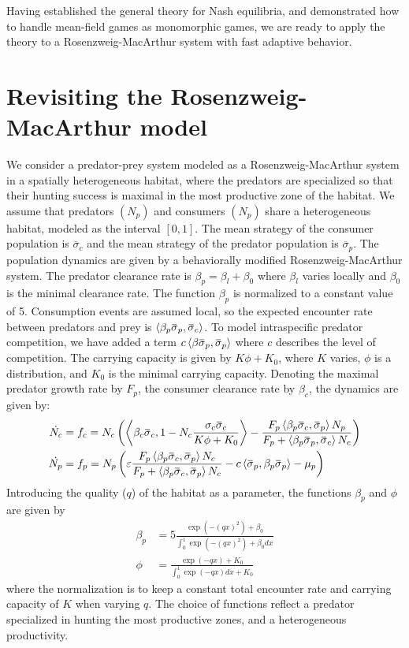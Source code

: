 Having established the general theory for Nash equilibria, and demonstrated how to handle mean-field games as monomorphic games, we are ready to apply the theory to a Rosenzweig-MacArthur system with fast adaptive behavior.
\section{Revisiting the Rosenzweig-MacArthur model}
\label{sec:model_rm}
We consider a predator-prey system modeled as a Rosenzweig-MacArthur system in a spatially heterogeneous habitat, where the predators are specialized so that their hunting success is maximal in the most productive zone of the habitat.
We assume that predators $(N_p)$ and consumers $(N_p)$ share a heterogeneous habitat, modeled as the interval $[0,1]$. The mean strategy of the consumer population is $\overbar{\sigma}_c$ and the mean strategy of the predator population is $\overbar{\sigma}_p$.
The population dynamics are given by a behaviorally modified Rosenzweig-MacArthur system. The predator clearance rate is $\beta_p = \beta_{l} + \beta_0$ where $\beta_l$ varies locally and $\beta_0$ is the minimal clearance rate. The function $\beta_p$ is normalized to a constant value of 5.
Consumption events are assumed local, so the expected encounter rate between predators and prey is $\ip{\beta_p \overbar{\sigma}_p}{\overbar{\sigma}_c}$. To model intraspecific predator competition, we have added a term $c\ip{\beta \overbar{\sigma}_p}{\overbar{\sigma}_p}$ where $c$ describes the level of competition. The carrying capacity is given by $K\phi + K_0$,
 where $K$ varies, $\phi$ is a distribution, and $K_0$ is the minimal carrying capacity. Denoting the maximal predator growth rate by $F_p$, the consumer clearance rate by $\beta_c$, the dynamics are given by:
\begin{align}
  \dot{N_c} &= f_c = N_c \pa{\ip{\beta_c \overbar{\sigma}_c}{1-N_c \frac{\sigma_c \overbar{\sigma}_c}{K\phi + K_0}} - \frac{F_p \ip{\beta_p \overbar{\sigma}_c}{\overbar{\sigma}_p} N_p}{F_p + \ip{\beta_p \overbar{\sigma}_p}{\overbar{\sigma}_c} N_c} } \\
  \dot{N_p} &= f_p = N_p \pa{\epsilon \frac{F_p \ip{\beta_p \overbar{\sigma}_c}{\overbar{\sigma}_p} N_c}{F_p + \ip{\beta_p \overbar{\sigma}_c}{\overbar{\sigma}_p} N_c} - c \ip{\overbar{\sigma}_p}{\beta_p \overbar{\sigma}_p}  - \mu_p}
  \label{eq:dynamics}
\end{align}
Introducing the quality ($q$) of the habitat as a parameter, the functions $\beta_p$ and $\phi$ are given by
\begin{align}
  \beta_p &= 5 \frac{\exp(-(q x)^2) + \beta_0}{\int_0^1 \exp(-(q x)^2) + \beta_0 dx} \\
  \phi &= \frac{\exp(-q x) + K_0}{\int_0^1 \exp(-q x) dx + K_0 }
\end{align}
where the normalization is to keep a constant total encounter rate and carrying capacity of $K$ when varying $q$. The choice of functions reflect a predator specialized in hunting the most productive zones, and a heterogeneous productivity.

